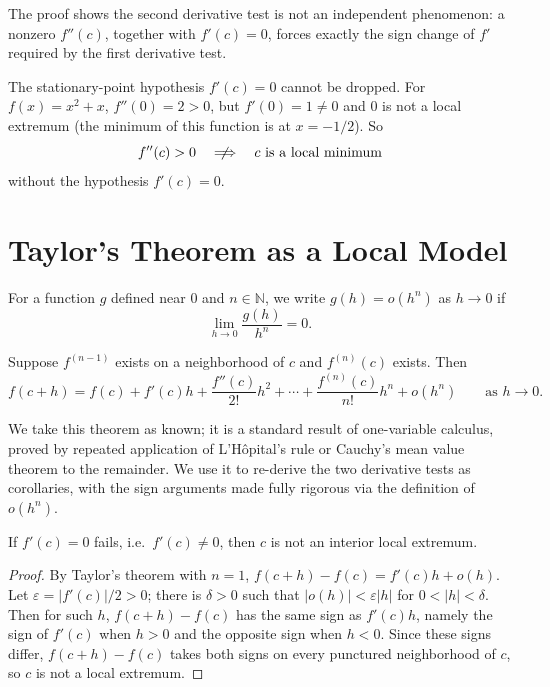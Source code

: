 \documentclass{essay}
\begin{document}
The proof shows the second derivative test is not an independent
phenomenon: a nonzero \(f''(c)\), together with \(f'(c)=0\), forces exactly
the sign change of \(f'\) required by the first derivative test.

\begin{remark}
The stationary-point hypothesis \(f'(c)=0\) cannot be dropped. For
\(f(x)=x^2+x\), \(f''(0)=2>0\), but \(f'(0)=1\neq0\) and \(0\) is not a
local extremum (the minimum of this function is at \(x=-1/2\)). So
\[
f''(c)>0 \quad\centernot\Longrightarrow\quad c \text{ is a local minimum}
\]
without the hypothesis \(f'(c)=0\).
\end{remark}

\section{Taylor's Theorem as a Local Model}

\begin{definition}[Little-\(o\)]
For a function \(g\) defined near \(0\) and \(n\in\mathbb{N}\), we write
\(g(h)=o(h^n)\) as \(h\to0\) if
\[
\lim_{h\to0}\frac{g(h)}{h^n}=0.
\]
\end{definition}

\begin{theorem}
Suppose \(f^{(n-1)}\) exists on a neighborhood of \(c\) and \(f^{(n)}(c)\)
exists. Then
\[
f(c+h)=f(c)+f'(c)h+\frac{f''(c)}{2!}h^2+\cdots+\frac{f^{(n)}(c)}{n!}h^n+o(h^n)
\qquad\text{as } h\to0.
\]
\end{theorem}

We take this theorem as known; it is a standard result of one-variable
calculus, proved by repeated application of L'H\^opital's rule or Cauchy's
mean value theorem to the remainder. We use it to re-derive the two
derivative tests as corollaries, with the sign arguments made fully
rigorous via the definition of \(o(h^n)\).

\begin{corollary}
If \(f'(c)=0\) fails, i.e.\ \(f'(c)\neq0\), then \(c\) is not an interior
local extremum.
\end{corollary}

\begin{proof}
By Taylor's theorem with \(n=1\), \(f(c+h)-f(c)=f'(c)h+o(h)\). Let
\(\varepsilon=|f'(c)|/2>0\); there is \(\delta>0\) such that
\(|o(h)|<\varepsilon|h|\) for \(0<|h|<\delta\). Then for such \(h\),
\(f(c+h)-f(c)\) has the same sign as \(f'(c)h\), namely the sign of
\(f'(c)\) when \(h>0\) and the opposite sign when \(h<0\). Since these
signs differ, \(f(c+h)-f(c)\) takes both signs on every punctured
neighborhood of \(c\), so \(c\) is not a local extremum.
\end{proof}
\end{document}
